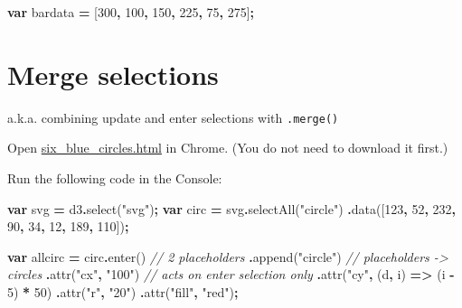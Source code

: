 \documentclass[
  openany]{book}
\newenvironment{Shaded}{\begin{snugshade}}{\end{snugshade}}
\newcommand{\CommentTok}[1]{\textcolor[rgb]{0.56,0.35,0.01}{\textit{#1}}}
\newcommand{\DecValTok}[1]{\textcolor[rgb]{0.00,0.00,0.81}{#1}}
\newcommand{\FunctionTok}[1]{\textcolor[rgb]{0.00,0.00,0.00}{#1}}
\newcommand{\KeywordTok}[1]{\textcolor[rgb]{0.13,0.29,0.53}{\textbf{#1}}}
\newcommand{\NormalTok}[1]{#1}
\newcommand{\OperatorTok}[1]{\textcolor[rgb]{0.81,0.36,0.00}{\textbf{#1}}}
\newcommand{\StringTok}[1]{\textcolor[rgb]{0.31,0.60,0.02}{#1}}
\begin{document}
\begin{Shaded}
\begin{Highlighting}[]
    \KeywordTok{var}\NormalTok{ bardata }\OperatorTok{=}\NormalTok{ [}\DecValTok{300}\OperatorTok{,} \DecValTok{100}\OperatorTok{,} \DecValTok{150}\OperatorTok{,} \DecValTok{225}\OperatorTok{,} \DecValTok{75}\OperatorTok{,} \DecValTok{275}\NormalTok{]}\OperatorTok{;}
\end{Highlighting}
\end{Shaded}

\hypertarget{merge-selections}{%
\section{\texorpdfstring{Merge selections }{Merge selections }}\label{merge-selections}}

a.k.a. combining update and enter selections with \texttt{.merge()}

Open \href{code/six_blue_circles.html}{six\_blue\_circles.html} in Chrome. (You do not need to download it first.)

Run the following code in the Console:

\begin{Shaded}
\begin{Highlighting}[]
\KeywordTok{var}\NormalTok{ svg }\OperatorTok{=}\NormalTok{ d3}\OperatorTok{.}\FunctionTok{select}\NormalTok{(}\StringTok{"svg"}\NormalTok{)}\OperatorTok{;}
\KeywordTok{var}\NormalTok{ circ }\OperatorTok{=}\NormalTok{ svg}\OperatorTok{.}\FunctionTok{selectAll}\NormalTok{(}\StringTok{"circle"}\NormalTok{)}
  \OperatorTok{.}\FunctionTok{data}\NormalTok{([}\DecValTok{123}\OperatorTok{,} \DecValTok{52}\OperatorTok{,} \DecValTok{232}\OperatorTok{,} \DecValTok{90}\OperatorTok{,} \DecValTok{34}\OperatorTok{,} \DecValTok{12}\OperatorTok{,} \DecValTok{189}\OperatorTok{,} \DecValTok{110}\NormalTok{])}\OperatorTok{;}
  
\KeywordTok{var}\NormalTok{ allcirc }\OperatorTok{=}\NormalTok{ circ}\OperatorTok{.}\FunctionTok{enter}\NormalTok{()  }\CommentTok{// 2 placeholders}
        \OperatorTok{.}\FunctionTok{append}\NormalTok{(}\StringTok{"circle"}\NormalTok{)  }\CommentTok{// placeholders {-}\textgreater{} circles}
          \OperatorTok{.}\FunctionTok{attr}\NormalTok{(}\StringTok{"cx"}\OperatorTok{,} \StringTok{"100"}\NormalTok{)  }\CommentTok{// acts on enter selection only}
          \OperatorTok{.}\FunctionTok{attr}\NormalTok{(}\StringTok{"cy"}\OperatorTok{,}\NormalTok{ (d}\OperatorTok{,}\NormalTok{ i) }\KeywordTok{=\textgreater{}}\NormalTok{ (i }\OperatorTok{{-}} \DecValTok{5}\NormalTok{) }\OperatorTok{*} \DecValTok{50}\NormalTok{)}
          \OperatorTok{.}\FunctionTok{attr}\NormalTok{(}\StringTok{"r"}\OperatorTok{,} \StringTok{"20"}\NormalTok{)}
          \OperatorTok{.}\FunctionTok{attr}\NormalTok{(}\StringTok{"fill"}\OperatorTok{,} \StringTok{"red"}\NormalTok{)}\OperatorTok{;}
\end{Highlighting}
\end{Shaded}
\end{document}
